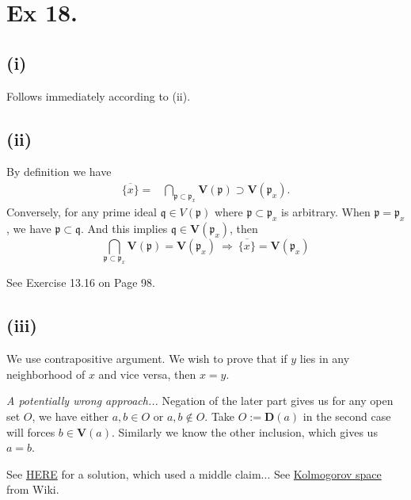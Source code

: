 \section{Ex 18.}\label{Atiyah Chapter 1 Ex 18.}

\subsection{(i)}

Follows immediately according to (ii).

\subsection{(ii)}

By definition we have \begin{align*}
    \overline{\{x\}} =& \bigcap_{\mathfrak p\subset \mathfrak p_x} \mathbf V(\mathfrak p) \supset \mathbf V(\mathfrak p_x).
\end{align*}Conversely, for any prime ideal $\mathfrak q\in V(\mathfrak p)$ where $\mathfrak p\subset \mathfrak p_x$ is arbitrary. When $\mathfrak p=\mathfrak p_x$, we have $\mathfrak p\subset \mathfrak q$. And this implies $\mathfrak q\in \mathbf V(\mathfrak p_x)$, then 
\[\bigcap_{\mathfrak p\subset \mathfrak p_x} \mathbf V(\mathfrak p) = \mathbf V(\mathfrak p_x) ~\Rightarrow~ \overline{\{x\}} = \mathbf V(\mathfrak p_x)\]

See Exercise 13.16 \cite{altman} on Page 98. 

\subsection{(iii)} 

We use contrapositive argument. We wish to prove that if $y$ lies in any neighborhood of $x$ and vice versa, then $x=y$.  

\textit{A potentially wrong approach...}
Negation of the later part gives us for any open set $O$, we have either $a,b\in O$ or $a,b\notin O$. Take $O:=\mathbf D(a)$ in the second case will forces $b\in\mathbf V(a)$. Similarly we know the other inclusion, which gives us $a=b$. 

See \href{https://math.stackexchange.com/questions/108503/operatornamespec-a-as-a-topological-space-satisfying-the-t-0-axiom}{HERE}  for a solution, which used a middle claim...
See \href{https://en.wikipedia.org/wiki/Kolmogorov_space}{Kolmogorov space} from Wiki.



